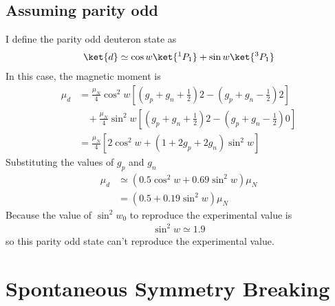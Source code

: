 \subsection{Assuming parity odd}
I define the parity odd deuteron state as
\begin{align*}
    \ket{d}\simeq\cos{w}\ket{^1P_1}+\sin{w}\ket{^3P_1}
\end{align*}
In this case, the magnetic moment is
\begin{align*}
    \mu_d&=\frac{\mu_N}{4}\cos^2{w}\left[\left(g_p+g_n+\frac{1}{2}\right)2-\left(g_p+g_n-\frac{1}{2}\right)2\right]\\
    &\ \ \ \ +\frac{\mu_N}{4}\sin^2{w}\left[\left(g_p+g_n+\frac{1}{2}\right)2-\left(g_p+g_n-\frac{1}{2}\right)0\right]\\
    &=\frac{\mu_N}{4}[2\cos^2{w}+(1+2g_p+2g_n)\sin^2{w}]
\end{align*}
Substituting the values of $g_p$ and $g_n$
\begin{align}
    \mu_d&\simeq(0.5\cos^2{w}+0.69\sin^2{w})\mu_N\nonumber\\
    &=(0.5+0.19\sin^2{w})\mu_N
\end{align}
Because the value of $\sin^2{w_0}$ to reproduce the experimental value is
\begin{align}
    \sin^2{w}\simeq1.9
\end{align}
so this parity odd state can't reproduce the experimental value.
\clearpage
\section{Spontaneous Symmetry Breaking}
